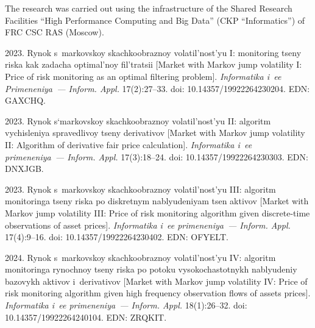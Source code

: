 



\vspace*{-12pt}

\Ack

\vspace*{-3pt}


     \noindent
     The research was carried out using the infrastructure of the Shared Research Facilities ``High Performance Computing and Big Data'' 
(CKP ``Informatics'') of FRC CSC RAS (Moscow).


  \begin{multicols}{2}

\renewcommand{\bibname}{\protect\rmfamily References}

{\small\frenchspacing
 {%
 \begin{thebibliography}{99} 
 2023. 
Rynok s~markovskoy skachkoobraznoy volatil'nost'yu I: monitoring tseny riska kak zadacha optimal'noy fil'tratsii 
[Market with Markov jump volatility I: Price of risk monitoring as an optimal filtering problem]. 
\textit{Informatika i~ee Primeneniya~--- Inform. Appl.} 17(2):27--33. 
doi: 10.14357/19922264230204. EDN: GAXCHQ.

 2023. 
Rynok s`markovskoy skachkoobraznoy volatil'nost'yu II: algoritm vychisleniya spravedlivoy tseny derivativov 
[Market with Markov jump volatility II: Algorithm of derivative fair price calculation].
\textit{Informatika i~ee primeneniya~--- Inform. Appl.} 17(3):18--24. 
doi: 10.14357/19922264230303. EDN: DNXJGB.

 2023. 
Rynok s~markovskoy skachkoobraznoy volatil'nost'yu III: algoritm monitoringa tseny riska po diskretnym nablyudeniyam tsen aktivov 
[Market with Markov jump volatility III: Price of risk monitoring algorithm given discrete-time observations of asset prices]. 
\textit{Informatika i~ee primeneniya~--- Inform. Appl.} 17(4):9--16. 
doi: 10.14357/19922264230402. EDN: OFYELT.

 2024. Rynok s~markovskoy skachkoobraznoy volatil'nost'yu IV: algoritm monitoringa rynochnoy tseny riska po potoku 
vysokochastotnykh nablyudeniy bazovykh aktivov i~derivativov [Market with Markov jump volatility IV: 
Price of risk monitoring algorithm given high frequency observation flows of assets prices]. 
\textit{Informatika i~ee primeneniya~--- Inform. Appl.} 18(1):26--32. doi: 10.14357/19922264240104. EDN: ZRQKIT.


\end{thebibliography}}}
\end{multicols}

